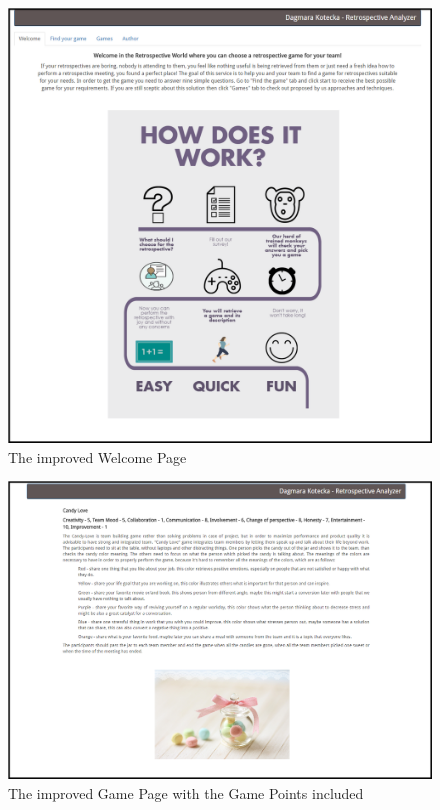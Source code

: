 \begin{figure}[ht!]
\caption{The improved Welcome Page}
\label{fig:welcomePageImpr}
\centering
\includegraphics[width=1.0\textwidth]{img/newWelcome}
\end{figure}

\begin{figure}[ht!]
\caption{The improved Game Page with the Game Points included}
\label{fig:gamePageImpr}
\centering
\includegraphics[width=1.0\textwidth]{img/newGame}
\end{figure}

